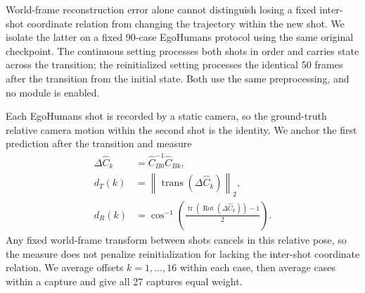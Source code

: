 World-frame reconstruction error alone cannot distinguish losing a fixed
inter-shot coordinate relation from changing the trajectory within the new
shot. We isolate the latter on a fixed 90-case EgoHumans protocol using the
same original \humanthree{} checkpoint. The continuous setting processes both
shots in order and carries state across the transition; the reinitialized
setting processes the identical 50 frames after the transition from the initial state.
Both use the same preprocessing, and no \method{} module is enabled.

Each EgoHumans shot is recorded by a static camera, so the ground-truth
relative camera motion within the second shot is the identity. We anchor the
first prediction after the transition and measure
\begin{equation}
 \begin{aligned}
  \Delta\hat C_k&=\hat C_{B0}^{-1}\hat C_{Bk},\\
  d_T(k)&=\left\|\operatorname{trans}(\Delta\hat C_k)\right\|_2,\\
  d_R(k)&=\cos^{-1}\!\left(
  \frac{\operatorname{tr}(\operatorname{Rot}(\Delta\hat C_k))-1}{2}\right).
 \end{aligned}
 \label{eq:state-isolation-drift}
\end{equation}
Any fixed world-frame transform between shots cancels in this relative pose,
so the measure does not penalize reinitialization for lacking the inter-shot
coordinate relation. We average offsets $k=1,\ldots,16$ within each case,
then average cases within a capture and give all 27 captures equal weight.

\begin{table}[t]
  \centering
  \caption{Isolating recurrent-state carry-over on the fixed 90-case
  EgoHumans protocol. The same original Human3R checkpoint processes identical
  frames after the transition with the preceding-shot state or a reinitialized
  state. We report mean within-shot
  camera drift over the next 16 frames after anchoring the first pose,
  with equal weight for each of 27 captures.}
  \label{tab:egohumans-state-isolation}
  \supptablesize
  
\end{table}

